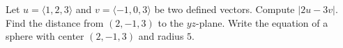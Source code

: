 \documentclass[addpoints]{exam}
\begin{document}
\begin{questions}
\question[20]  Let $u = \langle 1,2,3 \rangle$ and $v = \langle -1, 0, 3 \rangle$ be two defined vectors. 
Compute $|2u - 3v|$. 
\vspace{0.5cm}
\question[20] Find the distance from $(2,-1,3)$ to the $yz$-plane. 
\vspace{0.5cm}
\question[20] Write the equation of a sphere with center $(2,-1,3)$ and radius $5$. 


\end{questions}
\end{document}
